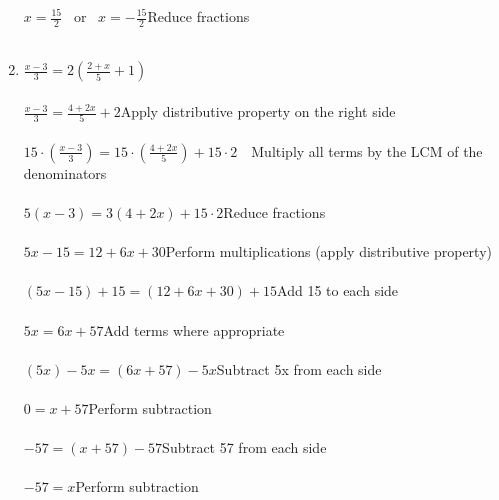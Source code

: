 \documentclass[a4paper,11pt]{article}
\begin{document}
\begin{enumerate}
         $x = \frac{15}{2}$ ~or~ $x = -\frac{15}{2}$\hfill Reduce fractions\\\\
    \item 
         $\frac{x-3}{3} = 2(\frac{2+x}{5} + 1)$ \\\\
         $\frac{x-3}{3} = \frac{4+2x}{5} + 2$\hfill Apply distributive property on the right side\\\\
         $15 \cdot (\frac{x-3}{3}) = 15 \cdot (\frac{4+2x}{5}) + 15 \cdot 2$\hfill ~~Multiply all terms by the LCM of the denominators\\\\
         $5(x-3) = 3(4+2x) + 15 \cdot 2$\hfill Reduce fractions\\\\
         $5x - 15 = 12 + 6x + 30$\hfill Perform multiplications (apply distributive property)\\\\
         $(5x - 15) + 15 = (12 + 6x + 30) + 15$\hfill Add 15 to each side\\\\
         $5x = 6x + 57$\hfill Add terms where appropriate\\\\
         $(5x) - 5x = (6x + 57) - 5x$\hfill Subtract 5x from each side\\\\
         $0 = x + 57$\hfill Perform subtraction\\\\
         $-57 = (x + 57) - 57$\hfill Subtract 57 from each side\\\\
         $-57 = x$\hfill Perform subtraction\\\\
\end{enumerate}
\end{document}
